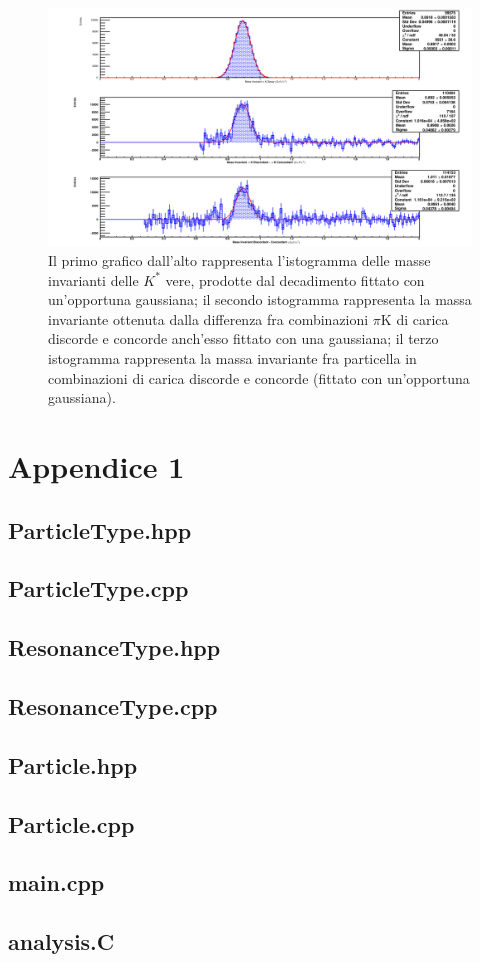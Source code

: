 \documentclass[a4paper,10 pt]{article}
\begin{document}
\begin{figure}[!]
    \centering
    \includegraphics[scale=0.25]{c2.pdf}
    \caption{Il primo grafico dall'alto rappresenta l'istogramma delle masse invarianti delle $K^*$ vere, prodotte dal decadimento fittato con un'opportuna gaussiana;
    il secondo istogramma rappresenta la massa invariante ottenuta dalla differenza fra combinazioni $\pi$K di carica discorde e concorde anch'esso fittato con una gaussiana;
    il terzo istogramma rappresenta la massa invariante fra particella in combinazioni di carica discorde e concorde (fittato con un'opportuna gaussiana).}
\end{figure}

\section*{Appendice 1}
\subsection*{ParticleType.hpp}


\subsection*{ParticleType.cpp}


\subsection*{ResonanceType.hpp}


\subsection*{ResonanceType.cpp}


\subsection*{Particle.hpp}


\subsection*{Particle.cpp}


\subsection*{main.cpp}


\subsection*{analysis.C}

\end{document}
